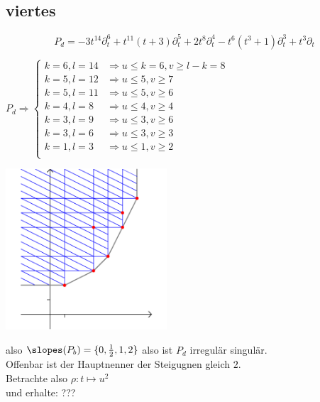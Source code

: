 \subsection{viertes}

\[
  P_d=-3t^{14}\partial_t^6+t^{11}(t+3)\partial_t^5 + 2t^8\partial_t^4
  -t^6(t^3+1)\partial_t^3 + t^3\partial_t
\]

$ P_d \Rightarrow
\begin{cases}
  k=6,l=14 & \Rightarrow u\leq k=6, v\geq l-k=8\\
  k=5,l=12 & \Rightarrow u\leq 5, v\geq 7\\
  k=5,l=11 & \Rightarrow u\leq 5, v\geq 6\\
  k=4,l=8 & \Rightarrow u\leq 4, v\geq 4\\
  k=3,l=9 & \Rightarrow u\leq 3, v\geq 6\\
  k=3,l=6 & \Rightarrow u\leq 3, v\geq 3\\
  k=1,l=3 & \Rightarrow u\leq 1, v\geq 2\\
\end{cases} $

\begin{center}
  \includegraphics[width=6cm]{img/d.png}
\end{center}
also $\slopes(P_b)=\{0,\frac{1}{2},1,2\}$ also ist $P_d$ irregulär singulär.\\
Offenbar ist der Hauptnenner der Steigugnen gleich $2$.\\
Betrachte also $\rho:t\mapsto u^2$\\
und erhalte: ???

